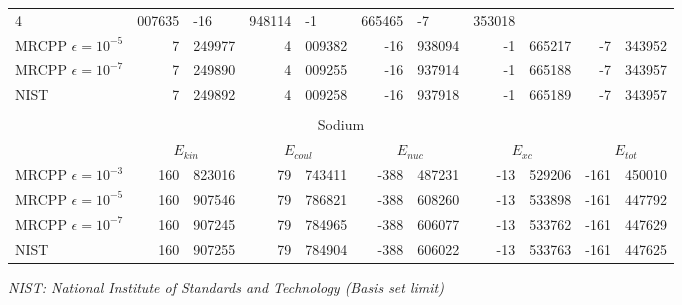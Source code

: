 \documentclass[mathserif]{beamer}
\begin{document}
\begin{frame}
\begin{table}
\begin{tabular}{|l|r@{.}l|r@{.}l|r@{.}l|r@{.}l|r@{.}l|}
			  4&007635&
			-16&948114&
			 -1&665465&
			 -7&353018\\
			MRCPP $\epsilon=10^{-5}$&
			  7&249977&
			  4&009382&
			-16&938094&
			 -1&665217&
			 -7&343952\\
			MRCPP $\epsilon=10^{-7}$&
			  7&249890&
			  4&009255&
			-16&937914&
			 -1&665188&
			 -7&343957\\
			\hline
			NIST&
			  7&249892&
			  4&009258&
			-16&937918&
			 -1&665189&
			 -7&343957\\
			\hline
			\multicolumn{11}{c}{}\\
			\multicolumn{11}{c}{Sodium}\\
			\hline
			&
			\multicolumn{2}{c|}{$E_{kin}$}&
			\multicolumn{2}{c|}{$E_{coul}$}&
			\multicolumn{2}{c|}{$E_{nuc}$}&
			\multicolumn{2}{c|}{$E_{xc}$}&
			\multicolumn{2}{c|}{$E_{tot}$}\\
			\hline
			MRCPP $\epsilon=10^{-3}$&
			 160&823016&
			  79&743411&
			-388&487231&
			 -13&529206&
			-161&450010\\
			MRCPP $\epsilon=10^{-5}$&
			 160&907546&
			  79&786821&
			-388&608260&
			 -13&533898&
			-161&447792\\
			MRCPP $\epsilon=10^{-7}$&
			 160&907245&
			  79&784965&
			-388&606077&
			 -13&533762&
			-161&447629\\
			\hline
			NIST&
			 160&907255&
			  79&784904&
			-388&606022&
			 -13&533763&
			-161&447625\\
			\hline
		\end{tabular}
	\end{table}
	\tiny
	\it{NIST: National Institute of Standards and Technology (Basis set limit)}\\
\end{frame}
\end{document}
